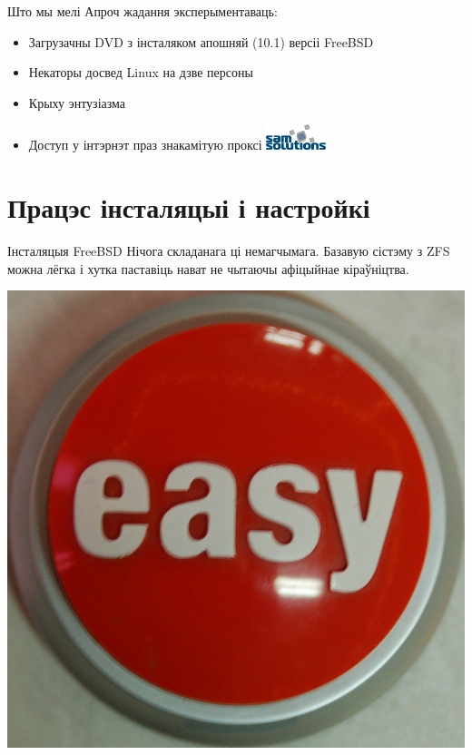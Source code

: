 \documentclass[ignorenonframetext,hyperref={pdftex,unicode}]{beamer}
\begin{document}
\begin{frame}{Што мы мелі} 
	Апроч жадання эксперыментаваць:
	\begin{itemize}
		\item Загрузачны DVD з інсталяком апошняй (10.1) версіі FreeBSD
		\item Некаторы досвед Linux на дзве персоны
		\item Крыху энтузіазма
		\item Доступ у інтэрнэт праз знакамітую проксі { }\includegraphics[height=2em,keepaspectratio]{SaMLogo}
	\end{itemize}
\end{frame} %

\section{Працэс інсталяцыі і настройкі}
\begin{frame}{Інсталяцыя FreeBSD} %
	Нічога складанага ці немагчымага. Базавую сістэму з ZFS можна лёгка і хутка паставіць нават не чытаючы афіцыйнае кіраўніцтва.
	\begin{center}
 		\includegraphics[height=0.5\textheight,keepaspectratio]{338391435_f1e7094228_z} %
	\end{center}
\end{frame} %
\end{document}
